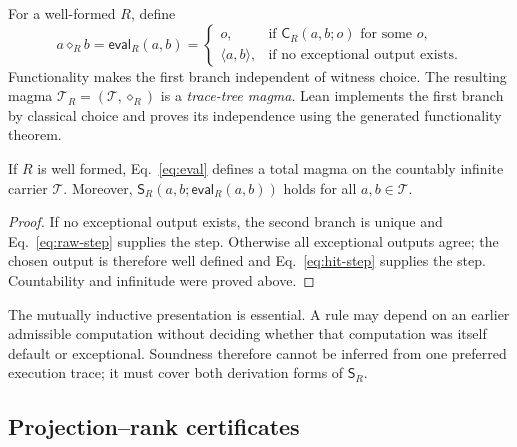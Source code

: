 \documentclass[runningheads]{llncs}
\newcommand{\Tree}{\mathcal{T}}
\newcommand{\Code}{\mathsf{C}}
\newcommand{\Step}{\mathsf{S}}
\newcommand{\evalop}{\mathsf{eval}}
\newcommand{\pair}[2]{\langle #1,#2\rangle}
\begin{document}
For a well-formed $R$, define
\begin{equation}
 a\mathbin{\diamond_R}b=\evalop_R(a,b)=
 \begin{cases}
   o,&\text{if }\Code_R(a,b;o)\text{ for some }o,\\
   \pair{a}{b},&\text{if no exceptional output exists.}
 \end{cases}
 \label{eq:eval}
\end{equation}
Functionality makes the first branch independent of witness choice.  The
resulting magma \(\mathcal T_R=(\Tree,\diamond_R)\) is a \emph{trace-tree
magma}.  Lean implements the first branch by classical choice and proves its
independence using the generated functionality theorem.

\begin{proposition}
\label{prop:well-defined}
If $R$ is well formed, Eq.~\eqref{eq:eval} defines a total magma on the
countably infinite carrier $\Tree$.  Moreover,
\(\Step_R(a,b;\evalop_R(a,b))\) holds for all $a,b\in\Tree$.
\end{proposition}

\begin{proof}
If no exceptional output exists, the second branch is unique and
Eq.~\eqref{eq:raw-step} supplies the step.  Otherwise all exceptional outputs agree;
the chosen output is therefore well defined and Eq.~\eqref{eq:hit-step}
supplies the step.  Countability and infinitude were proved above.
\end{proof}

The mutually inductive presentation is essential.  A rule may depend on an
earlier admissible computation without deciding whether that computation was
itself default or exceptional.  Soundness therefore cannot be inferred from
one preferred execution trace; it must cover both derivation forms of
\(\Step_R\).

\subsection{Projection--rank certificates}
\label{sec:rank-certificates}
\end{document}
